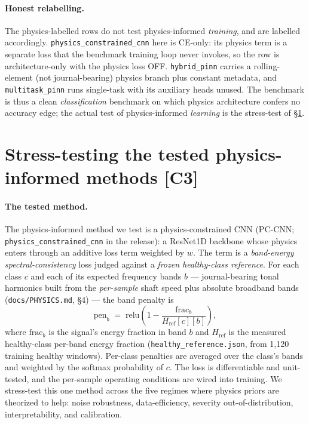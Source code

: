 \documentclass{article}
\newcommand{\code}[1]{\nolinkurl{#1}}
\begin{document}
\paragraph{Honest relabelling.}
The physics-labelled rows do not test physics-informed \emph{training}, and are
labelled accordingly. \texttt{physics\_constrained\_cnn} here is CE-only: its
physics term is a separate loss that the benchmark training loop never invokes,
so the row is architecture-only with the physics loss OFF.
\texttt{hybrid\_pinn} carries a rolling-element (not journal-bearing) physics
branch plus constant metadata, and \texttt{multitask\_pinn} runs single-task
with its auxiliary heads unused. The benchmark is thus a clean
\emph{classification} benchmark on which physics architecture confers no
accuracy edge; the actual test of physics-informed \emph{learning} is the
stress-test of \S\ref{sec:stress}.



\section{Stress-testing the tested physics-informed methods [C3]}
\label{sec:stress}
\paragraph{The tested method.}
The physics-informed method we test is a physics-constrained CNN (PC-CNN;
\code{physics_constrained_cnn} in the release): a ResNet1D backbone whose physics
enters through an additive loss term weighted by $w$. The term is a
\emph{band-energy spectral-consistency} loss judged against a \emph{frozen
healthy-class reference}. For each class $c$ and each of its expected frequency
bands $b$ --- journal-bearing tonal harmonics built from the \emph{per-sample}
shaft speed plus absolute broadband bands (\code{docs/PHYSICS.md}, \S4) --- the
band penalty is
\begin{equation}
  \mathrm{pen}_b \;=\; \mathrm{relu}\!\left(1 - \frac{\mathrm{frac}_b}{H_{\mathrm{ref}}[c][b]}\right),
\end{equation}
where $\mathrm{frac}_b$ is the signal's energy fraction in band $b$ and
$H_{\mathrm{ref}}$ is the measured healthy-class per-band energy fraction
(\code{healthy_reference.json}, from 1{,}120 training healthy windows).
Per-class penalties are averaged over the class's bands and weighted by the
softmax probability of $c$. The loss is differentiable and unit-tested, and the
per-sample operating conditions are wired into training. We stress-test this one
method across the five regimes where physics priors are theorized to help: noise
robustness, data-efficiency, severity out-of-distribution, interpretability, and
calibration.
\end{document}
